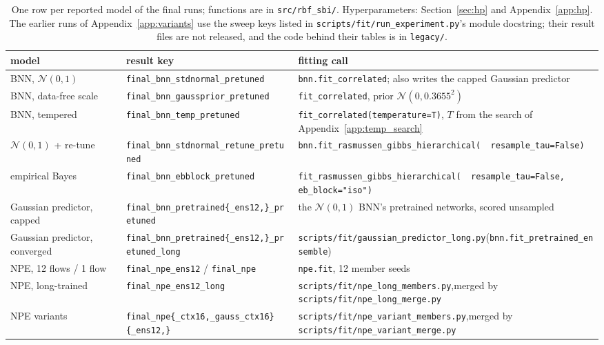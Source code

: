 \documentclass[11pt]{article}
\newcommand{\nzo}{\mathcal{N}(0,1)}
\newcommand{\code}[1]{\texttt{#1}}
\begin{document}
\begin{table}[h]
\centering\footnotesize\setlength{\tabcolsep}{3pt}
\begin{tabular}{@{}>{\raggedright}p{2.35cm}l>{\raggedright\arraybackslash}p{6.4cm}@{}}
\toprule
model & result key & fitting call \\
\midrule
BNN, $\nzo$ & \code{final\_bnn\_stdnormal\_pretuned} & \code{bnn.fit\_correlated}; also writes the capped Gaussian predictor \\
BNN, data-free scale & \code{final\_bnn\_gaussprior\_pretuned} & \code{fit\_correlated}, prior $\mathcal N(0,0.3655^2)$ \\
BNN, tempered & \code{final\_bnn\_temp\_pretuned} & \code{fit\_correlated(temperature=T)}, $T$ from the search of Appendix~\ref{app:temp_search} \\
$\nzo$ + re-tune & \code{final\_bnn\_stdnormal\_retune\_pretuned} & \code{bnn.fit\_rasmussen\_gibbs\_hierarchical(}\newline\code{\ \ resample\_tau=False)} \\
empirical Bayes & \code{final\_bnn\_ebblock\_pretuned} & \code{fit\_rasmussen\_gibbs\_hierarchical(}\newline\code{\ \ resample\_tau=False, eb\_block="iso")} \\
Gaussian predictor, capped & \code{final\_bnn\_pretrained\{\_ens12,\}\_pretuned} & the $\nzo$ BNN's pretrained networks, scored unsampled \\
Gaussian predictor, converged & \code{final\_bnn\_pretrained\{\_ens12,\}\_pretuned\_long} & \code{scripts/fit/gaussian\_predictor\_long.py}\newline(\code{bnn.fit\_pretrained\_ensemble}) \\
NPE, 12 flows / 1 flow & \code{final\_npe\_ens12} / \code{final\_npe} & \code{npe.fit}, 12 member seeds \\
NPE, long-trained & \code{final\_npe\_ens12\_long} & \code{scripts/fit/npe\_long\_members.py},\newline merged by \code{scripts/fit/npe\_long\_merge.py} \\
NPE variants & \code{final\_npe\{\_ctx16,\_gauss\_ctx16\}\{\_ens12,\}} & \code{scripts/fit/npe\_variant\_members.py},\newline merged by \code{scripts/fit/npe\_variant\_merge.py} \\
\bottomrule
\end{tabular}
\caption{One row per reported model of the final runs; functions are in \code{src/rbf\_sbi/}. Hyperparameters:
Section~\ref{sec:hp} and Appendix~\ref{app:hp}. The earlier runs of Appendix~\ref{app:variants} use the sweep keys listed
in \code{scripts/fit/run\_experiment.py}'s module docstring; their result files are not released, and the code behind
their tables is in \code{legacy/}.}
\label{tab:repro}
\end{table}
\end{document}
